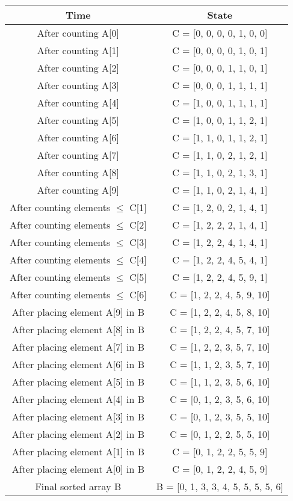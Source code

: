 \begin{center}
\begin{tabular}{| c | c |}
\hline
\textbf{Time} & \textbf{State} \\
\hline
After counting A[0] & C = [0, 0, 0, 0, 1, 0, 0]\\ 
\hline
After counting A[1] & C = [0, 0, 0, 0, 1, 0, 1]\\ 
\hline
After counting A[2] & C = [0, 0, 0, 1, 1, 0, 1]\\ 
\hline
After counting A[3] & C = [0, 0, 0, 1, 1, 1, 1]\\ 
\hline
After counting A[4] & C = [1, 0, 0, 1, 1, 1, 1]\\ 
\hline
After counting A[5] & C = [1, 0, 0, 1, 1, 2, 1]\\ 
\hline
After counting A[6] & C = [1, 1, 0, 1, 1, 2, 1]\\ 
\hline
After counting A[7] & C = [1, 1, 0, 2, 1, 2, 1]\\ 
\hline
After counting A[8] & C = [1, 1, 0, 2, 1, 3, 1]\\ 
\hline
After counting A[9] & C = [1, 1, 0, 2, 1, 4, 1]\\ 
\hline
After counting elements $\leq$ C[1] & C = [1, 2, 0, 2, 1, 4, 1]\\ 
\hline
After counting elements $\leq$ C[2] & C = [1, 2, 2, 2, 1, 4, 1]\\ 
\hline
After counting elements $\leq$ C[3] & C = [1, 2, 2, 4, 1, 4, 1]\\ 
\hline
After counting elements $\leq$ C[4] & C = [1, 2, 2, 4, 5, 4, 1]\\ 
\hline
After counting elements $\leq$ C[5] & C = [1, 2, 2, 4, 5, 9, 1]\\ 
\hline
After counting elements $\leq$ C[6] & C = [1, 2, 2, 4, 5, 9, 10]\\ 
\hline
After placing element A[9] in B & C = [1, 2, 2, 4, 5, 8, 10]\\ 
\hline
After placing element A[8] in B & C = [1, 2, 2, 4, 5, 7, 10]\\ 
\hline
After placing element A[7] in B & C = [1, 2, 2, 3, 5, 7, 10]\\ 
\hline
After placing element A[6] in B & C = [1, 1, 2, 3, 5, 7, 10]\\ 
\hline
After placing element A[5] in B & C = [1, 1, 2, 3, 5, 6, 10]\\ 
\hline
After placing element A[4] in B & C = [0, 1, 2, 3, 5, 6, 10]\\ 
\hline
After placing element A[3] in B & C = [0, 1, 2, 3, 5, 5, 10]\\ 
\hline
After placing element A[2] in B & C = [0, 1, 2, 2, 5, 5, 10]\\ 
\hline
After placing element A[1] in B & C = [0, 1, 2, 2, 5, 5, 9]\\ 
\hline
After placing element A[0] in B & C = [0, 1, 2, 2, 4, 5, 9]\\ 
\hline
Final sorted array B & B = [0, 1, 3, 3, 4, 5, 5, 5, 5, 6]\\ 
\hline
\end{tabular}
\end{center}
